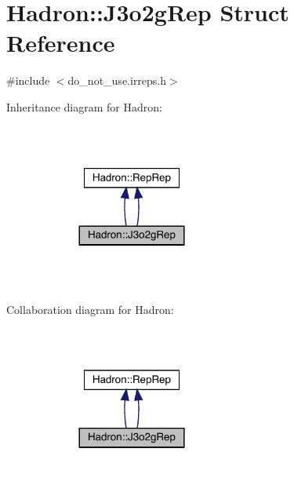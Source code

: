 \hypertarget{structHadron_1_1J3o2gRep}{}\section{Hadron\+:\+:J3o2g\+Rep Struct Reference}
\label{structHadron_1_1J3o2gRep}


{\ttfamily \#include $<$do\+\_\+not\+\_\+use.\+irreps.\+h$>$}



Inheritance diagram for Hadron\+:
\nopagebreak
\begin{figure}[H]
\begin{center}
\leavevmode
\includegraphics[width=180pt]{dd/d2c/structHadron_1_1J3o2gRep__inherit__graph}
\end{center}
\end{figure}


Collaboration diagram for Hadron\+:
\nopagebreak
\begin{figure}[H]
\begin{center}
\leavevmode
\includegraphics[width=180pt]{d1/da7/structHadron_1_1J3o2gRep__coll__graph}
\end{center}
\end{figure}

